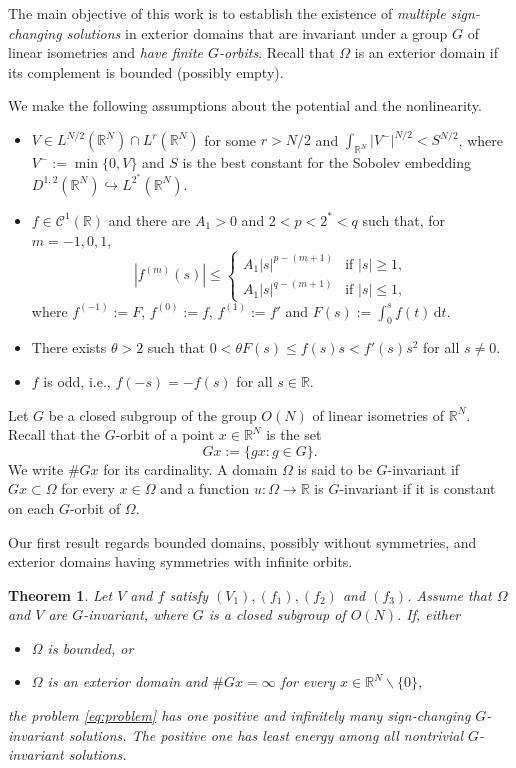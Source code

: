 \documentclass[10pt,letterpaper]{article}
\newtheorem{theorem}{Theorem}[section]
\numberwithin{equation}{section}
\def\r{\mathbb{R}}
\def\rn{\mathbb{R}^N}
\def\irn{\int_{\r^N}}
\def\o{\Omega}
\def\cC{\mathcal{C}}
\def\d{\,\mathrm{d}}
\begin{document}
The main objective of this work is to establish the existence of \emph{multiple sign-changing solutions} in exterior domains that are invariant under a group $G$ of linear isometries and \emph{have finite $G$-orbits}. Recall that $\o$ is an exterior domain if its complement is bounded (possibly empty). 

We make the following assumptions about the potential and the nonlinearity. 

\begin{itemize}
\item[$(V_1)$] $V\in L^{N/2}(\rn)\cap L^r(\rn)$ for some $r > N/2$ and $\irn|V^-|^{N/2} < S^{N/2}$, where $V^-:=\min\{0,V\}$ and $S$ is the best constant for the Sobolev embedding $D^{1,2}(\rn)\hookrightarrow L^{2^*}(\rn)$.
\item [$(f_1)$] $f\in\cC^1(\r)$ and there are $A_1>0$ and $2<p<2^*<q$ such that, for $m=-1,0,1,$
\begin{equation}
|f^{(m)}(s)| \leq 
\begin{cases}
A_1|s|^{p-(m+1)} &\text{if \ } |s|\geq 1, \\
A_1|s|^{q-(m+1)} &\text{if \ } |s| \leq 1, 
\end{cases}
\end{equation}
where $f^{(-1)}:=F$, $f^(0):=f $, $f^{(1)}:= f'$ and $F(s):= \int_{0}^{s} f(t)\d t$.
\item [$(f_2)$] There exists $\theta >2$ such that $0<\theta F(s)\leq f(s)s<f'(s)s^2$ for all $s\neq 0$. 
\item [$(f_3)$] $f$ is odd, i.e., $f(-s)=-f(s)$ for all $s\in\r$.
\end{itemize}

Let $G$ be a closed subgroup of the group $O(N)$ of linear isometries of $\rn$. Recall that the $G$-orbit of a point $x\in\rn$ is the set
$$Gx:=\{gx:g\in G\}.$$
We write $\#Gx$ for its cardinality. A domain $\o$ is said to be $G$-invariant if $Gx\subset\o$ for every $x\in\o$ and a function $u:\o\to\r$ is $G$-invariant if it is constant on each $G$-orbit of $\o$.

Our first result regards bounded domains, possibly without symmetries, and exterior domains having symmetries with infinite orbits.

\begin{theorem} \label{thm:main1}
Let $V$ and $f$ satisfy $(V_1), (f_1), (f_2)$ and $(f_3)$. Assume that  $\o$ and $V$ are $G$-invariant, where $G$ is a closed subgroup of $O(N)$. If, either
\begin{itemize}
\item $\o$ is bounded, or
\item $\o$ is an exterior domain and $\#Gx = \infty$ for every $x\in\rn\smallsetminus\{0\}$,
\end{itemize}
the problem \eqref{eq:problem} has one positive and infinitely many sign-changing $G$-invariant solutions. The positive one has least energy among all nontrivial $G$-invariant solutions.
\end{theorem}
\end{document}
